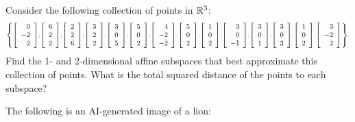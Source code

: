 \documentclass{ximera}
\begin{document}
\begin{problem}
  Consider the following collection of points in $\R^3$:
  \begin{equation*}\scriptstyle
    \set{
      \startmat{r} 0 \\ -2 \\ 2 \stopmat,
      \startmat{r} 6 \\ 2 \\ 2 \stopmat,
      \startmat{r} 2 \\ 2 \\ 6 \stopmat,
      \startmat{r} 3 \\ 2 \\ 2 \stopmat,
      \startmat{r} 3 \\ 0 \\ 5 \stopmat,
      \startmat{r} 5 \\ 0 \\ 2 \stopmat,
      \startmat{r} 4 \\ -2 \\ -2 \stopmat,
      \startmat{r} 5 \\ 0 \\ 2 \stopmat,
      \startmat{r} 1 \\ 0 \\ 2 \stopmat,
      \startmat{r} 3 \\ 0 \\ -1 \stopmat,
      \startmat{r} 3 \\ 0 \\ 1 \stopmat,
      \startmat{r} 3 \\ 0 \\ 3 \stopmat,
      \startmat{r} 1 \\ 0 \\ 2 \stopmat,
      \startmat{r} 3 \\ -2 \\ 2 \stopmat
    }.
  \end{equation*}
  Find the 1- and 2-dimensional affine subspaces that best approximate
  this collection of points. What is the total squared
  distance of the points to each subspace?
\end{problem}

\begin{problem}

  The following is an AI-generated image of a lion:

  

\end{problem}
\end{document}
